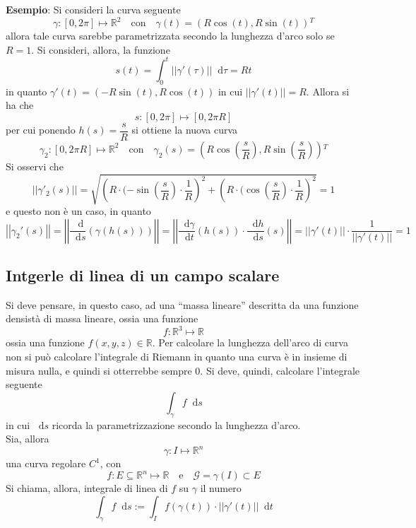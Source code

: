 \documentclass[a4paper]{extarticle}
\newcommand{\quotes}[1]{``#1''}
\newcommand*\dif{\mathop{}\!\mathrm{d}}
\begin{document}
\vspace{2em}
\noindent
\textbf{Esempio}: Si consideri la curva seguente
\[\gamma : [0,2\pi] \longmapsto \mathbb{R}^2 \hspace{1em} \text{con} \hspace{1em} \gamma(t)=\left(R\cos(t),R\sin(t)\right){^T}\]
allora tale curva sarebbe parametrizzata secondo la lunghezza d'arco solo se $R=1$. Si consideri, allora, la funzione
\[s(t)=\int_0^t \left\vert\left\vert\gamma'(\tau)\right\vert\right\vert\dif\tau=Rt\]
in quanto $\gamma'(t)=(-R\sin(t),R\cos(t))$ in cui $\vert\vert\gamma'(t)\vert\vert=R$. Allora si ha che
\[s:[0,2\pi] \longmapsto [0,2\pi R]\]
per cui ponendo $h(s)=\dfrac{s}{R}$ si ottiene la nuova curva
\[\gamma_2 : [0,2\pi R] \longmapsto \mathbb{R}^2 \hspace{1em} \text{con} \hspace{1em} \gamma_2(s) = \left(R \cos \left(\dfrac{s}{R}\right), R \sin\left(\dfrac{s}{R}\right)\right){^T}\]
Si osservi che
\[\left\vert\left\vert\gamma'_2(s)\right\vert\right\vert=\sqrt{\left(R \cdot (-\sin \left(\dfrac{s}{R}\right) \cdot \dfrac{1}{R}\right)^2 + \left(R \cdot (\cos \left(\dfrac{s}{R}\right) \cdot \dfrac{1}{R}\right)^2} = 1\]
e questo non è un caso, in quanto
\[\left\vert\left\vert\gamma_2'(s)\right\vert\right\vert = \left\vert\left\vert \dfrac{\dif}{\dif s} \left(\gamma(h(s))\right) \right\vert\right\vert= \left\vert\left\vert \dfrac{\dif \gamma}{\dif t} (h(s)) \cdot \dfrac{\dif h}{\dif s}(s) \right\vert\right\vert = \left\vert\left\vert \gamma'(t)\right\vert\right\vert \cdot \dfrac{1}{\vert\vert\gamma'(t)\vert\vert}=1\]

\vspace{1em}
\subsection{Intgerle di linea di un campo scalare}
Si deve pensare, in questo caso, ad una \quotes{massa lineare} descritta da una funzione densistà di massa lineare, ossia una funzione
\[f : \mathbb{R}^3 \longmapsto \mathbb{R}\]
ossia una funzione $f(x,y,z) \in \mathbb{R}$. Per calcolare la lunghezza dell'arco di curva non si può calcolare l'integrale di Riemann in quanto una curva è in insieme di misura nulla, e quindi si otterrebbe sempre $0$. Si deve, quindi, calcolare l'integrale seguente
\[\int_\gamma f \dif s\]
in cui $\dif s$ ricorda la parametrizzazione secondo la lunghezza d'arco.\\
Sia, allora
\[\gamma : I \longmapsto \mathbb{R}^n\]
una curva regolare $C^1$, con
\[f : E \subseteq \mathbb{R}^n \longmapsto \mathbb{R} \hspace{1em} \text{e} \hspace{1em} \mathcal{G} = \gamma(I) \subset E\]
Si chiama, allora, integrale di linea di $f$ su $\gamma$ il numero
\[\int_\gamma f \dif s := \int_I f(\gamma(t)) \cdot \left\vert\left\vert\gamma'(t)\right\vert\right\vert\dif t\]
\end{document}

